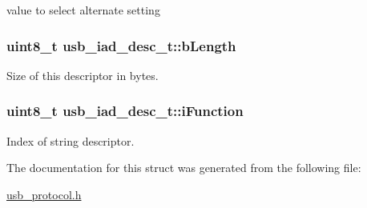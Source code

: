 value to select alternate setting 

\hypertarget{structusb__iad__desc__t_a13a3d5b27f54c67d2115e48902ce68c7}{
\subsubsection[{b\-Length}]{\setlength{\rightskip}{0pt plus 5cm}uint8\-\_\-t {\bf usb\-\_\-iad\-\_\-desc\-\_\-t\-::b\-Length}}}
\label{structusb__iad__desc__t_a13a3d5b27f54c67d2115e48902ce68c7}


\-Size of this descriptor in bytes. 

\hypertarget{structusb__iad__desc__t_a43d33cc1c219b1cac0c340dbcf1ec107}{
\subsubsection[{i\-Function}]{\setlength{\rightskip}{0pt plus 5cm}uint8\-\_\-t {\bf usb\-\_\-iad\-\_\-desc\-\_\-t\-::i\-Function}}}
\label{structusb__iad__desc__t_a43d33cc1c219b1cac0c340dbcf1ec107}


\-Index of string descriptor. 



\-The documentation for this struct was generated from the following file\-:\begin{DoxyCompactItemize}
\item 
\hyperlink{usb__protocol_8h}{usb\-\_\-protocol.\-h}\end{DoxyCompactItemize}
